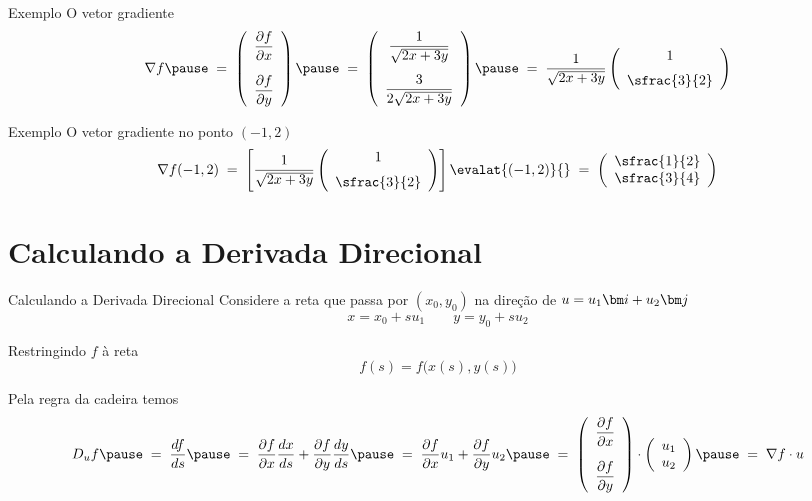 \begin{frame}{Exemplo \theexemplo}
  O vetor gradiente
  \[
    \nabla f
    \pause
    \;=\; \left(\begin{array}{c} \D{f}{x} \\[5mm] \D{f}{y} \end{array}\right)
    \pause
    \;=\; \left(\begin{array}{c}
             \dfrac{1}{\sqrt{2x+3y}} \\[5mm]
             \dfrac{3}{2\sqrt{2x+3y}}
          \end{array}\right)
    \pause
    \;=\; \frac{1}{\sqrt{2x+3y}} \left(\begin{array}{c}
            1 \\[2mm]
            \sfrac{3}{2}
          \end{array}\right)
  \]
\end{frame}

\begin{frame}{Exemplo \theexemplo}
  O vetor gradiente no ponto \((-1, 2)\)
  \[
    \nabla f(-1, 2)
    \;=\; \left[\frac{1}{\sqrt{2x+3y}} \left(\begin{array}{c}
      1 \\[2mm]
      \sfrac{3}{2}
    \end{array}\right)\right]\evalat{(-1, 2)}{}
    \;=\; \vetor{\sfrac{1}{2}}{\sfrac{3}{4}}
  \]
\end{frame}

\section{Calculando a Derivada Direcional}

\begin{frame}{Calculando a Derivada Direcional}
  Considere a reta que passa por \((x_0, y_0)\)
  \pause
  na direção de \(u=u_1\veci+u_2\vecj\)
  \pause
  \[
    x = x_0 + su_1 \qquad
    y = y_0 + su_2
  \]

  Restringindo $f$ à reta
  \[
    f(s) = f\big(x(s), y(s)\big)
  \]

  \pause
  Pela regra da cadeira temos
  \[
    D_u f
    \pause
    \;=\; \frac{df}{ds}
    \pause
    \;=\; \D{f}{x}\frac{dx}{ds} + \D{f}{y}\frac{dy}{ds}
    \pause
    \;=\; \D{f}{x}u_1 + \D{f}{y}u_2
    \pause
    \;=\; \left(\begin{array}{c} \D{f}{x} \\[5mm] \D{f}{y} \end{array}\right)
      \cdot \vetor{u_1}{u_2}
    \pause
    \;=\; \nabla f \cdot u
  \]
\end{frame}

